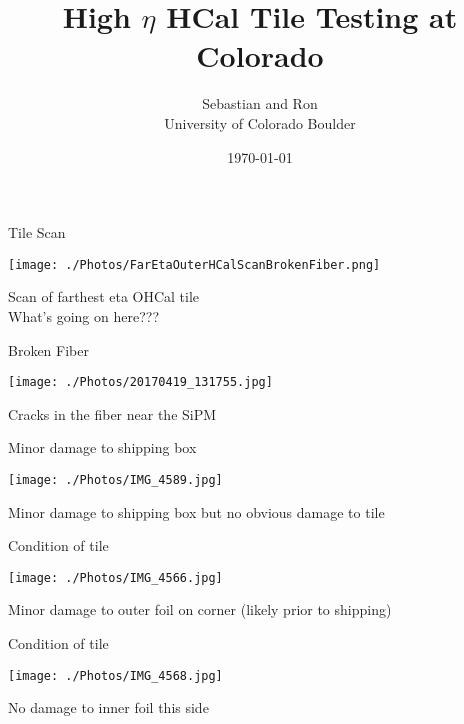 \documentclass[compress,10pt]{beamer} %
\title[\today - Slide \insertframenumber]{High $\eta$ HCal Tile Testing at Colorado}
\author[CU-Boulder]{Sebastian and Ron \\ \vspace{20pt} University of Colorado Boulder}
\date{\today}
\begin{document}
\begin{frame}
\titlepage
\end{frame}




\begin{frame}{Tile Scan}
\begin{adjustwidth}{-3em}{-3em}
\begin{center}
\texttt{[image: ./Photos/FarEtaOuterHCalScanBrokenFiber.png]}
\end{center}
\end{adjustwidth}
Scan of farthest eta OHCal tile \\
What's going on here???
\end{frame}


\begin{frame}{Broken Fiber}
\begin{adjustwidth}{-3em}{-3em}
\begin{center}
\texttt{[image: ./Photos/20170419\_131755.jpg]}
\end{center}
\end{adjustwidth}
Cracks in the fiber near the SiPM
\end{frame}


\begin{frame}{Minor damage to shipping box}
\begin{adjustwidth}{-3em}{-3em}
\begin{center}
\texttt{[image: ./Photos/IMG\_4589.jpg]}
\end{center}
\end{adjustwidth}
Minor damage to shipping box but no obvious damage to tile
\end{frame}


\begin{frame}{Condition of tile}
\begin{adjustwidth}{-3em}{-3em}
\begin{center}
\texttt{[image: ./Photos/IMG\_4566.jpg]}
\end{center}
\end{adjustwidth}
Minor damage to outer foil on corner (likely prior to shipping)
\end{frame}


\begin{frame}{Condition of tile}
\begin{adjustwidth}{-3em}{-3em}
\begin{center}
\texttt{[image: ./Photos/IMG\_4568.jpg]}
\end{center}
\end{adjustwidth}
No damage to inner foil this side
\end{frame}
\end{document}
